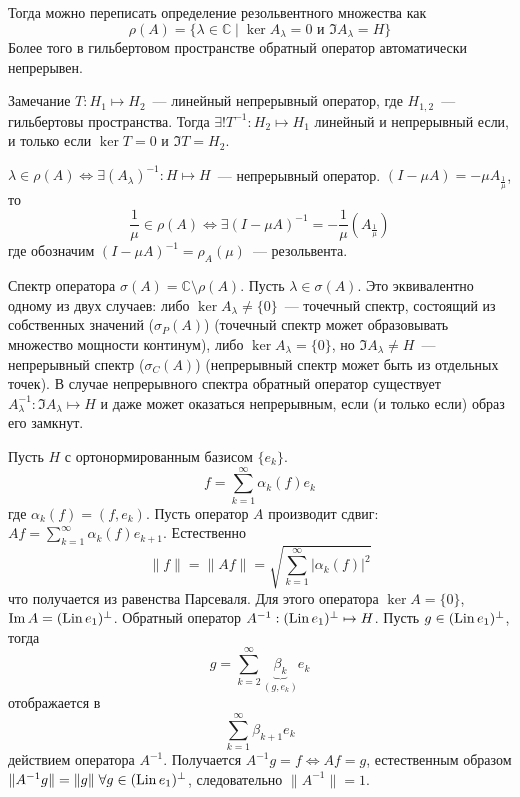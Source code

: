 \documentclass[14pt]{extarticle}
\begin{document}
Тогда можно переписать определение резольвентного множества как 
$$
\rho(A) = \{\lambda \in \mathbb C \mid \ker A_\lambda = 0\text{ и }\Im A_\lambda = H \}
$$
Более того в гильбертовом пространстве обратный оператор автоматически непрерывен.

\begin{MathCl}{Замечание}
    $T:H_1 \mapsto H_2$~--- линейный непрерывный оператор, где $H_{1,2}$~--- гильбертовы пространства.
    Тогда $\exists! T^{-1} : H_2 \mapsto H_1$ линейный и непрерывный если, и только если $\ker T = 0$ и $\Im T = H_2$.
\end{MathCl}

    $\lambda \in \rho(A) \Leftrightarrow \exists(A_\lambda)^{-1} : H \mapsto H$~--- непрерывный оператор.
    $(I - \mu A) = -\mu A_{\frac{1}{\mu}}$, то 
    $$
    \dfrac{1}{\mu} \in \rho(A) \Leftrightarrow \exists (I - \mu A)^{-1} = -\dfrac{1}{\mu}(A_{\frac{1}{\mu}})
    $$
    где обозначим $(I - \mu A)^{-1} = \rho_A(\mu)$~--- резольвента.
\begin{Opr}
    Спектр оператора $\sigma(A) = \mathbb C \setminus \rho(A)$. Пусть $\lambda \in \sigma(A)$.
    Это эквивалентно одному из двух случаев:
    либо $\ker A_\lambda \ne \{0\}$~--- точечный спектр, состоящий из собственных значений ($\sigma_P(A)$) (точечный спектр может образовывать множество мощности континум),
    либо $\ker A_\lambda = \{0\}$, но $\Im A_\lambda \ne H$~--- непрерывный спектр ($\sigma_C(A)$) (непрерывный спектр может быть из отдельных точек).
    В случае непрерывного спектра обратный оператор существует $A_\lambda^{-1} : \Im A_\lambda \mapsto H$ и даже может оказаться непрерывным, если (и только если) образ его
    замкнут.
\end{Opr}

\begin{Prim}
    Пусть $H$ с ортонормированным базисом $\{e_k\}$.
    $$
    f = \sum \limits_{k = 1}^{\infty} \alpha_k(f) e_k
    $$
    где $\alpha_k(f)=(f, e_k)$.
    Пусть оператор $A$ производит сдвиг: $Af = \sum \limits_{k = 1}^{\infty} \alpha_k(f) e_{k+1}$.
    Естественно 
    $$
    \|f\| = \|Af\| = \sqrt{\sum \limits_{k = 1}^{\infty} |\alpha_k(f)|^2}
    $$
    что получается из равенства Парсеваля.
    Для этого оператора
    $\ker A = \{0\}$, $\operatorname{Im} A = (\operatorname{Lin} e_1)^{\perp}$.
    Обратный оператор
    $A^{-1} : (\operatorname{Lin} e_1)^{\perp} \mapsto H$. Пусть $g \in (\operatorname{Lin} e_1)^{\perp}$, тогда
    $$
    g = \sum \limits_{k = 2}^{\infty}\underbrace{\beta_k}_{(g, e_k)}e_k
    $$ 
    отображается в 
    $$
    \sum\limits_{k = 1}^{\infty} \beta_{k + 1}e_k
    $$
    действием оператора $A^{-1}$.
    Получается $A^{-1}g = f \Leftrightarrow Af = g$, естественным образом $\|A^{-1}g\| = \|g\|\; \forall g \in (\operatorname{Lin} e_1)^{\perp}$, следовательно $\|A^{-1}\| = 1$.
\end{Prim}
\end{document}
